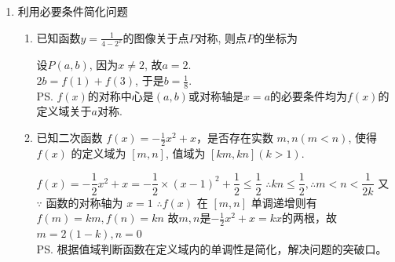 \begin{enumerate}
\begin{enumerate}
\begin{jieda}
\begin{enumerate}
            \item 若$t \in (0, 1)$，则方程有4个解
            \item 若$t = 1$，则方程有3个解
            \item 若$t > 1$，则方程有2个解
        \end{enumerate}
        对于外层方程$k = t - t^2$：
        \begin{enumerate}
            \item 若$k > \dfrac{1}{4}$，则外层方程无解，复合方程无解
            \item 若$k = \dfrac{1}{4}$，则存在唯一的$t = \dfrac{1}{2}$使外层方程成立，对复合方程本身有4个解
            \item 若$0 < k < \dfrac{1}{4}$，则外层方程两解$t_1, t_2 \in (0, 1)$，复合方程有8个解
            \item 若$k = 0$，则外层方程两解$t_1 = 0, t_2 = 1$，复合方程有5个解
            \item 若$k < 0$，则外层方程两解$t_1 < 0, t_2 > 1$，复合方程有2个解
        \end{enumerate}
    \end{jieda}
    \end{enumerate}
    \item 利用必要条件简化问题
    \begin{enumerate}
        \item 已知函数$y=\frac{1}{4-2^x}$的图像关于点$P$对称, 则点$P$的坐标为
        \begin{jieda}
        设$P(a,b)$, 因为$x\neq 2$, 故$a=2$. \\
        $2b=f(1)+f(3)$, 于是$b=\frac{1}{8}$. \\
        \ps $f(x)$的对称中心是$(a, b)$或对称轴是$x = a$的必要条件均为$f(x)$的定义域关于$a$对称.
        \end{jieda}
        \item 已知二次函数 $f(x)=-\frac{1}{2} x^2+x$，是否存在实数 $m, n(m<n)$, 使得 $f(x)$ 的定义域为 $[m, n]$, 值域为 $[k m, k n](k>1)$.
        \begin{jieda}
        $f(x)=-\dfrac{1}{2} x^2+x=-\dfrac{1}{2} \times(x-1)^2+\dfrac{1}{2} \leq \dfrac{1}{2}$
        $\therefore k n \leq \dfrac{1}{2}, \therefore m<n<\dfrac{1}{2k}$
        又 $\because$ 函数的对称轴为 $x=1$
        $\therefore f(x)$ 在 $[m, n]$ 单调递增则有 $f(m)=k m, f(n)=k n$
        故$m, n$是$-\frac{1}{2}x^2 + x = kx$的两根，故$m = 2(1-k), n = 0$ \\
        \ps 根据值域判断函数在定义域内的单调性是简化，解决问题的突破口。\\

\end{jieda}
\end{enumerate}
\end{enumerate}
